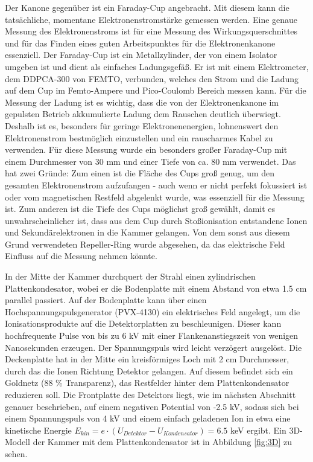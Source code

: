 Der Kanone gegenüber ist ein Faraday-Cup angebracht. Mit diesem kann die tatsächliche, momentane Elektronenstromstärke gemessen werden. Eine genaue Messung des Elektronenstroms ist für eine Messung des Wirkungsquerschnittes und für das Finden eines guten Arbeitspunktes für die Elektronenkanone essenziell. Der Faraday-Cup ist ein Metallzylinder, der von einem Isolator umgeben ist und dient als einfaches Ladungsgefäß. Er ist mit einem Elektrometer, dem DDPCA-300 von \textsc{FEMTO}, verbunden, welches den Strom und die Ladung auf dem Cup im Femto-Ampere und Pico-Coulomb Bereich messen kann. Für die Messung der Ladung ist es wichtig, dass die von der Elektronenkanone im gepulsten Betrieb akkumulierte Ladung dem Rauschen deutlich überwiegt. Deshalb ist es, besonders für geringe Elektronenenergien, lohnenswert den Elektronenstrom bestmöglich einzustellen und ein rauscharmes Kabel zu verwenden. Für diese Messung wurde ein besonders großer Faraday-Cup mit einem Durchmesser von 30 mm und einer Tiefe von ca. 80 mm verwendet. Das hat zwei Gründe: Zum einen ist die Fläche des Cups groß genug, um den gesamten Elektronenstrom aufzufangen - auch wenn er nicht perfekt fokussiert ist oder vom magnetischen Restfeld abgelenkt wurde, was essenziell für die Messung ist. Zum anderen ist die Tiefe des Cups möglichst groß gewählt, damit es unwahrscheinlicher ist, dass aus dem Cup durch Stoßionisation entstandene Ionen und Sekundärelektronen in die Kammer gelangen. Von dem sonst aus diesem Grund verwendeten Repeller-Ring wurde abgesehen, da das elektrische Feld Einfluss auf die Messung nehmen könnte.

In der Mitte der Kammer durchquert der Strahl einen zylindrischen Plattenkondesator, wobei er die Bodenplatte mit einem Abstand von etwa 1.5 cm parallel passiert. Auf der Bodenplatte kann über einen Hochspannungspulsgenerator (PVX-4130) ein elektrisches Feld angelegt, um die Ionisationsprodukte auf die Detektorplatten zu beschleunigen. Dieser kann hochfrequente Pulse von bis zu 6 kV mit einer Flankenanstiegszeit von wenigen Nanosekunden erzeugen. Der Spannungspuls wird leicht verzögert ausgelöst. Die Deckenplatte hat in der Mitte ein kreisförmiges Loch mit 2 cm Durchmesser, durch das die Ionen Richtung Detektor gelangen. Auf diesem befindet sich ein Goldnetz (88 \% Transparenz), das Restfelder hinter dem Plattenkondensator reduzieren soll. Die Frontplatte des Detektors liegt, wie im nächsten Abschnitt genauer beschrieben, auf einem negativen Potential von -2.5 kV, sodass sich bei einem Spannungspuls von 4 kV und einem einfach geladenen Ion in etwa eine kinetische Energie $E_{kin} = e \cdot (U_{Detektor} - U_{Kondensator}) = 6.5$ keV ergibt. Ein 3D-Modell der Kammer mit dem Plattenkondensator ist in Abbildung \ref{fig:3D} zu sehen.


